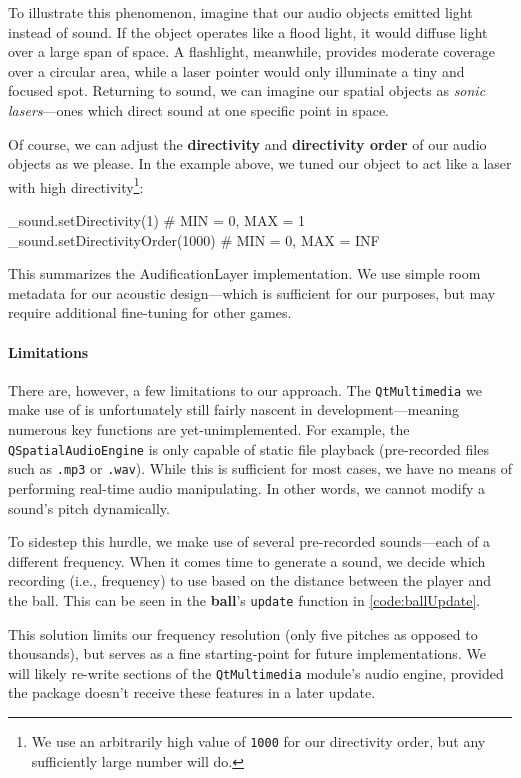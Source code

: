 \documentclass{report}
\newcommand{\ball}{\textbf{ball}\xspace}
\newcommand{\tech}[1]{\textbf{#1}}
\begin{document}
To illustrate this phenomenon, imagine that our audio objects emitted light instead of sound. If the object operates like a flood light, it would diffuse light over a large span of space. A flashlight, meanwhile, provides moderate coverage over a circular area, while a laser pointer would only illuminate a tiny and focused spot. Returning to sound, we can imagine our spatial objects as \emph{sonic lasers}---ones which direct sound at one specific point in space. 

Of course, we can adjust the \tech{directivity} and \tech{directivity order} of our audio objects as we please. In the example above, we tuned our object to act like a laser with high directivity\footnote{We use an arbitrarily high value of \texttt{1000} for our directivity order, but any sufficiently large number will do.}:

\begin{codeblock}
    _sound.setDirectivity(1) # MIN = 0, MAX = 1
    _sound.setDirectivityOrder(1000) # MIN = 0, MAX = INF
\end{codeblock}

This summarizes the AudificationLayer implementation. We use simple room metadata for our acoustic design---which is sufficient for our purposes, but may require additional fine-tuning for other games. 

\paragraph{Limitations}
There are, however, a few limitations to our approach. The \texttt{QtMultimedia} we make use of is unfortunately still fairly nascent in development---meaning numerous key functions are yet-unimplemented. For example, the \texttt{QSpatialAudioEngine} is only capable of static file playback (pre-recorded files such as \texttt{.mp3} or \texttt{.wav}). While this is sufficient for most cases, we have no means of performing real-time audio manipulating. In other words, we cannot modify a sound's pitch dynamically. 

To sidestep this hurdle, we make use of several pre-recorded sounds---each of a different frequency. When it comes time to generate a sound, we decide which recording (i.e., frequency) to use based on the distance between the player and the ball. This can be seen in the \ball's \texttt{update} function in \cref{code:ballUpdate}. 

This solution limits our frequency resolution (only five pitches as opposed to thousands), but serves as a fine starting-point for future implementations. We will likely re-write sections of the \texttt{QtMultimedia} module's audio engine, provided the package doesn't receive these features in a later update.
\end{document}
